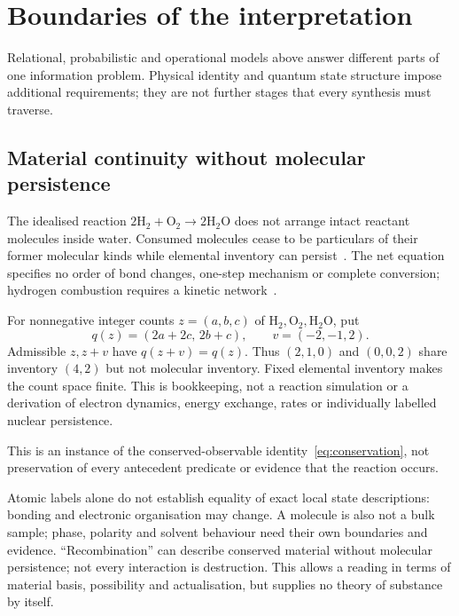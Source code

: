 \documentclass[11pt]{article}
\begin{document}
\section{Boundaries of the interpretation}\label{sec:interpretation}
Relational, probabilistic and operational models above answer different parts of one information problem. Physical identity and quantum state structure impose additional requirements; they are not further stages that every synthesis must traverse.

\subsection{Material continuity without molecular persistence}\label{sec:chemistry}
The idealised reaction $2\mathrm H_2+\mathrm O_2\longrightarrow2\mathrm H_2\mathrm O$ does not arrange intact reactant molecules inside water. Consumed molecules cease to be particulars of their former molecular kinds while elemental inventory can persist~\cite{iupac}. The net equation specifies no order of bond changes, one-step mechanism or complete conversion; hydrogen combustion requires a kinetic network~\cite{li}.

For nonnegative integer counts $z=(a,b,c)$ of $\mathrm H_2,\mathrm O_2,\mathrm H_2\mathrm O$, put
\begin{equation}\label{eq:chemistry}
q(z)=(2a+2c,\,2b+c),\qquad v=(-2,-1,2).
\end{equation}
Admissible $z,z+v$ have $q(z+v)=q(z)$. Thus $(2,1,0)$ and $(0,0,2)$ share inventory $(4,2)$ but not molecular inventory. Fixed elemental inventory makes the count space finite. This is bookkeeping, not a reaction simulation or a derivation of electron dynamics, energy exchange, rates or individually labelled nuclear persistence.

This is an instance of the conserved-observable identity~\eqref{eq:conservation}, not preservation of every antecedent predicate or evidence that the reaction occurs.

Atomic labels alone do not establish equality of exact local state descriptions: bonding and electronic organisation may change. A molecule is also not a bulk sample; phase, polarity and solvent behaviour need their own boundaries and evidence. ``Recombination'' can describe conserved material without molecular persistence; not every interaction is destruction. This allows a reading in terms of material basis, possibility and actualisation, but supplies no theory of substance by itself.
\end{document}
